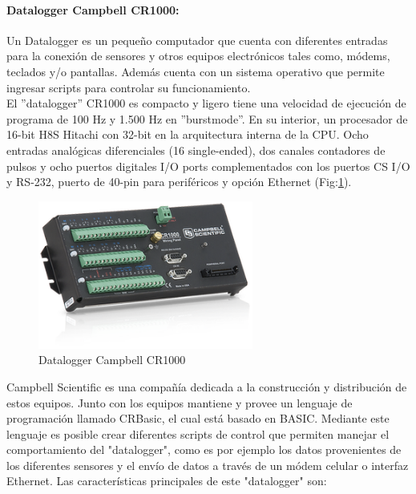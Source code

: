 \paragraph{Datalogger Campbell CR1000:}
Un Datalogger es un pequeño computador que cuenta con diferentes entradas para la conexión de sensores y otros equipos electrónicos tales como, módems, teclados y/o pantallas. Además cuenta con un sistema operativo que permite ingresar scripts para controlar su funcionamiento.\\El ''datalogger'' CR1000 es compacto y ligero tiene una velocidad de ejecución de programa de 100 Hz y 1.500 Hz en ''burstmode''. En su interior, un procesador de 16-bit H8S Hitachi con 32-bit en la arquitectura interna de la CPU.
Ocho entradas analógicas diferenciales (16 single-ended), dos canales contadores
de pulsos y ocho puertos digitales I/O ports complementados con los puertos CS I/O y RS-232, puerto de 40-pin para periféricos y opción Ethernet (Fig:\ref{cr1000}).

\begin{figure}[h!]
	\centering
	\includegraphics[width=200pt]{images/cr1000}
	\caption{Datalogger Campbell CR1000}
	\label{cr1000}
\end{figure}

Campbell Scientific es una compañía dedicada a la construcción y distribución de estos equipos. Junto con los equipos mantiene y provee un lenguaje de programación llamado CRBasic, el cual está basado en BASIC\cite{hardware:basic}. Mediante este lenguaje es posible crear diferentes scripts de control que permiten manejar el comportamiento del "datalogger", como es por ejemplo los datos provenientes de los diferentes sensores y el envío de datos a través de un módem celular o interfaz Ethernet. Las características principales de este "datalogger" son:

